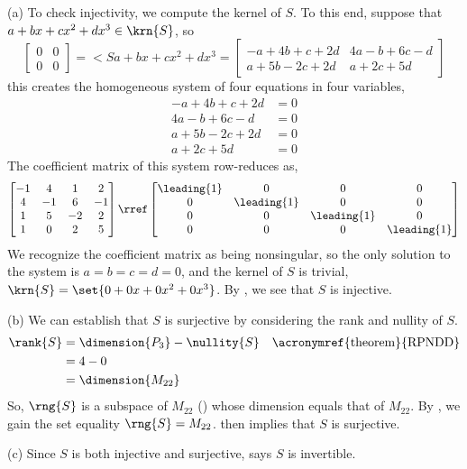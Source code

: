 (a) To check injectivity, we compute the kernel of $S$.  To this end, suppose that $a+bx+cx^2+dx^3\in\krn{S}$, so 
%
\begin{equation*}
\begin{bmatrix}
0 & 0\\
0 & 0
\end{bmatrix}
=\lt{S}{a+bx+cx^2+dx^3}
=
\begin{bmatrix}
-a+4b+c+2d & 4a-b+6c-d\\
a+5b-2c+2d & a+2c+5d
\end{bmatrix}
\end{equation*}
%
this creates the homogeneous system of four equations in four variables,
%
\begin{align*}
-a+4b+c+2d&=0\\
4a-b+6c-d&=0\\
a+5b-2c+2d&=0\\
a+2c+5d&=0
\end{align*}
%
The coefficient matrix of this system row-reduces as,
%
\begin{align*}
\begin{bmatrix}
 -1 & 4 & 1 & 2 \\
 4 & -1 & 6 & -1 \\
 1 & 5 & -2 & 2 \\
 1 & 0 & 2 & 5
\end{bmatrix}
\rref
\begin{bmatrix}
 \leading{1} & 0 & 0 & 0 \\
 0 & \leading{1} & 0 & 0 \\
 0 & 0 & \leading{1} & 0 \\
 0 & 0 & 0 & \leading{1}
\end{bmatrix}
\end{align*}
%
We recognize the coefficient matrix as being nonsingular, so the only solution to the system is $a=b=c=d=0$, and the kernel of $S$ is trivial, $\krn{S}=\set{0+0x+0x^2+0x^3}$.  By , we see that $S$ is injective.\par
%
(b)  We can establish that $S$ is surjective by considering the rank and nullity of $S$.
%
\begin{align*}
\rank{S}
&=\dimension{P_3}-\nullity{S}&&\text{\acronymref{theorem}{RPNDD}}\\
&=4-0\\
&=\dimension{M_{22}}
\end{align*}
%
So, $\rng{S}$ is a subspace of $M_{22}$ () whose dimension equals that of $M_{22}$.  By , we gain the set equality $\rng{S}=M_{22}$.   then implies that $S$ is surjective.\par
%
(c)  Since $S$ is both injective and surjective,  says $S$ is invertible.